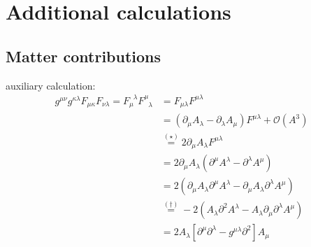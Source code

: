 \chapter{Additional calculations}
\blindtext

\section{Matter contributions}
auxiliary calculation:
\begin{align}
g^{\mu\nu}g^{\kappa\lambda} F_{\mu\kappa}F_{\nu\lambda} =  F_{\mu}^{\phantom{\mu}\lambda}F_{\phantom{\mu}\lambda}^{\mu}	&= F_{\mu\lambda}F^{\mu\lambda} \nonumber	\\
&= \left(\partial_{\mu}A_{\lambda} - \partial_{\lambda}A_{\mu}\right)F^{\mu\lambda} + \mathcal{O}\left(A^3\right)\nonumber \\
&\overset{(\star)}{=} 2\partial_{\mu}A_{\lambda} F^{\mu\lambda}\nonumber  \\
&=  2\partial_{\mu}A_{\lambda}\left(\partial^{\mu}A^{\lambda} - \partial^{\lambda}A^{\mu}\right) \\
&= 2\left(\partial_{\mu}A_{\lambda}\partial^{\mu}A^{\lambda} - \partial_{\mu}A_{\lambda}\partial^{\lambda}A^{\mu}\right) \nonumber\\
&\overset{(\dagger)}{=} -2\left( A_{\lambda}\partial^2A^{\lambda} - A_{\lambda}\partial_{\mu}\partial^{\lambda}A^{\mu}\right) \nonumber\\
&= 2A_{\lambda}\left[\partial^{\mu}\partial^{\lambda} - g^{\mu\lambda}\partial^2\right]A_{\mu}\nonumber \label{eqn:FF2} 
\end{align}
